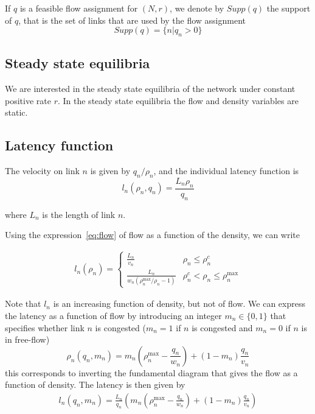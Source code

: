If $q$ is a feasible flow assignment for $(N, r)$, we denote by $Supp(q)$ the support of $q$, that is the set of links that are used by the flow assignment
\[
Supp(q) = \{ n | q_n >0 \}
\]

\subsection{Steady state equilibria}
We are interested in the steady state equilibria of the network under constant positive rate $r$. In the steady state equilibria the flow and density variables are static.


\subsection{Latency function}
The velocity on link $n$ is given by $q_n/\rho_n$, and the individual latency function is
\[
l_n(\rho_n, q_n) = \frac{L_n\rho_n}{q_n} 
\]

where $L_n$ is the length of link $n$.

Using the expression~\ref{eq:flow} of flow as a function of the density, we can write

\begin{align*}
l_n(\rho_n) = 
\begin{cases}
\frac{L_n}{ v_n} & \rho_n \leq \rho_n^c\\
\frac{L_n}{ w_n(\rho_n^{\max}/\rho_n - 1)} & \rho_n^c < \rho_n \leq \rho_n^{\max}
\end{cases}
\end{align*}

Note that $l_n$ is an increasing function of density, but not of flow. We can express the latency as a function of flow by introducing an integer $m_n \in \{0, 1\}$ that specifies whether link $n$ is congested ($m_n = 1$ if $n$ is congested and $m_n = 0$ if $n$ is in free-flow)
\[
\rho_n(q_n, m_n) = m_n \left( \rho_n^{\max} - \frac{q_n}{w_n} \right) + (1-m_n)\frac{q_n}{v_n}
\]
this corresponds to inverting the fundamental diagram that gives the flow as a function of density. The latency is then given by
\begin{align}
\label{eq:latency}
l_n(q_n, m_n) = \frac{L_n}{q_n} \left( m_n \left( \rho_n^{\max} - \frac{q_n}{w_n} \right)  + (1-m_n)\frac{q_n}{v_n} \right)
\end{align}

